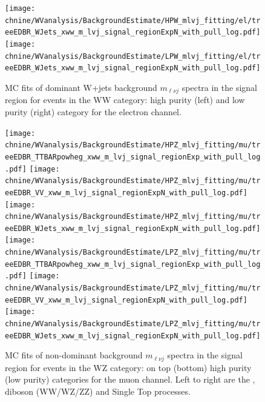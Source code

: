 \begin{figure}[htbp]
\centering
\texttt{[image: \\chnine/WVanalysis/BackgroundEstimate/HPW\_mlvj\_fitting/el/treeEDBR\_WJets\_xww\_m\_lvj\_signal\_regionExpN\_with\_pull\_log.pdf]}
\texttt{[image: \\chnine/WVanalysis/BackgroundEstimate/LPW\_mlvj\_fitting/el/treeEDBR\_WJets\_xww\_m\_lvj\_signal\_regionExpN\_with\_pull\_log.pdf]}\\
\caption{MC fits of dominant W+jets background $m_{\ell\nu j}$ spectra in the \mJ signal region for events in the WW category:
high purity (left) and low purity (right) category for the electron channel.}
\label{fig:srWfitmlvj_2b}
\end{figure}


\begin{figure}[htbp]
\centering
\texttt{[image: \\chnine/WVanalysis/BackgroundEstimate/HPZ\_mlvj\_fitting/mu/treeEDBR\_TTBARpowheg\_xww\_m\_lvj\_signal\_regionExp\_with\_pull\_log.pdf]}
\texttt{[image: \\chnine/WVanalysis/BackgroundEstimate/HPZ\_mlvj\_fitting/mu/treeEDBR\_VV\_xww\_m\_lvj\_signal\_regionExpN\_with\_pull\_log.pdf]}
\texttt{[image: \\chnine/WVanalysis/BackgroundEstimate/HPZ\_mlvj\_fitting/mu/treeEDBR\_WJets\_xww\_m\_lvj\_signal\_regionExpN\_with\_pull\_log.pdf]}\\
\texttt{[image: \\chnine/WVanalysis/BackgroundEstimate/LPZ\_mlvj\_fitting/mu/treeEDBR\_TTBARpowheg\_xww\_m\_lvj\_signal\_regionExp\_with\_pull\_log.pdf]}
\texttt{[image: \\chnine/WVanalysis/BackgroundEstimate/LPZ\_mlvj\_fitting/mu/treeEDBR\_VV\_xww\_m\_lvj\_signal\_regionExpN\_with\_pull\_log.pdf]}
\texttt{[image: \\chnine/WVanalysis/BackgroundEstimate/LPZ\_mlvj\_fitting/mu/treeEDBR\_WJets\_xww\_m\_lvj\_signal\_regionExpN\_with\_pull\_log.pdf]}\\
\caption{MC fits of non-dominant background $m_{\ell\nu j}$ spectra in the \mJ signal region for events in the WZ category: on top (bottom) high purity (low purity) categories for the muon channel. Left to right are the \ttbar, diboson (WW/WZ/ZZ) and Single Top processes.}
\label{fig:srZfitmlvj_1}
\end{figure}

